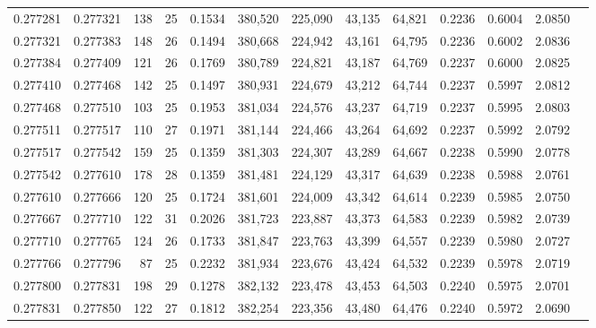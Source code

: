 \begin{tabular}{rrrrrrrrrrrrr}
0.277281 & 0.277321 &   138 &  25 &                                     0.1534 & 380,520 & 225,090 &  43,135 &  64,821 & 0.2236 & 0.6004 & 2.0850 \\
0.277321 & 0.277383 &   148 &  26 &                                     0.1494 & 380,668 & 224,942 &  43,161 &  64,795 & 0.2236 & 0.6002 & 2.0836 \\
0.277384 & 0.277409 &   121 &  26 &                                     0.1769 & 380,789 & 224,821 &  43,187 &  64,769 & 0.2237 & 0.6000 & 2.0825 \\
0.277410 & 0.277468 &   142 &  25 &                                     0.1497 & 380,931 & 224,679 &  43,212 &  64,744 & 0.2237 & 0.5997 & 2.0812 \\
0.277468 & 0.277510 &   103 &  25 &                                     0.1953 & 381,034 & 224,576 &  43,237 &  64,719 & 0.2237 & 0.5995 & 2.0803 \\
0.277511 & 0.277517 &   110 &  27 &                                     0.1971 & 381,144 & 224,466 &  43,264 &  64,692 & 0.2237 & 0.5992 & 2.0792 \\
0.277517 & 0.277542 &   159 &  25 &                                     0.1359 & 381,303 & 224,307 &  43,289 &  64,667 & 0.2238 & 0.5990 & 2.0778 \\
0.277542 & 0.277610 &   178 &  28 &                                     0.1359 & 381,481 & 224,129 &  43,317 &  64,639 & 0.2238 & 0.5988 & 2.0761 \\
0.277610 & 0.277666 &   120 &  25 &                                     0.1724 & 381,601 & 224,009 &  43,342 &  64,614 & 0.2239 & 0.5985 & 2.0750 \\
0.277667 & 0.277710 &   122 &  31 &                                     0.2026 & 381,723 & 223,887 &  43,373 &  64,583 & 0.2239 & 0.5982 & 2.0739 \\
0.277710 & 0.277765 &   124 &  26 &                                     0.1733 & 381,847 & 223,763 &  43,399 &  64,557 & 0.2239 & 0.5980 & 2.0727 \\
0.277766 & 0.277796 &    87 &  25 &                                     0.2232 & 381,934 & 223,676 &  43,424 &  64,532 & 0.2239 & 0.5978 & 2.0719 \\
0.277800 & 0.277831 &   198 &  29 &                                     0.1278 & 382,132 & 223,478 &  43,453 &  64,503 & 0.2240 & 0.5975 & 2.0701 \\
0.277831 & 0.277850 &   122 &  27 &                                     0.1812 & 382,254 & 223,356 &  43,480 &  64,476 & 0.2240 & 0.5972 & 2.0690 \\

\end{tabular}
